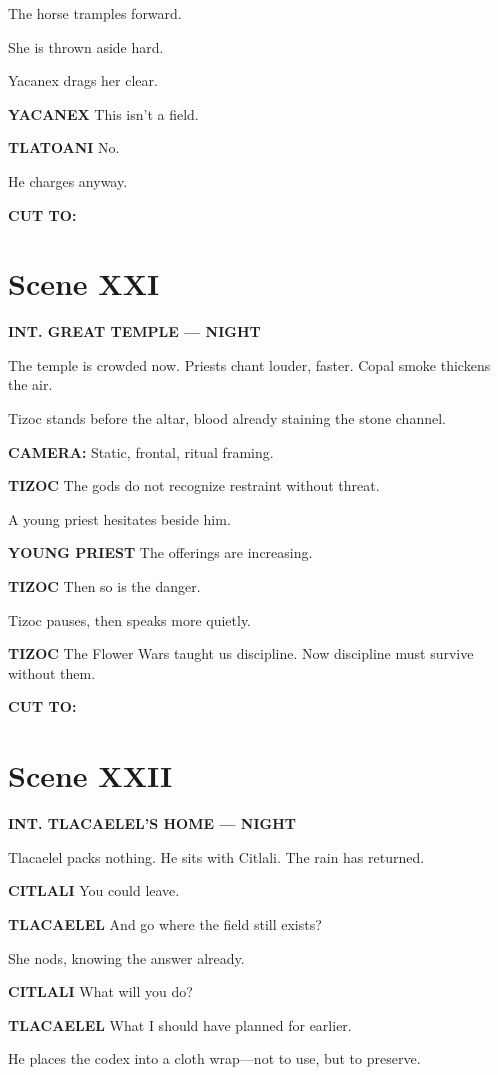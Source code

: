 \documentclass[12pt]{article}
\begin{document}
The horse tramples forward.

She is thrown aside hard.

Yacanex drags her clear.

\textbf{YACANEX}  
This isn’t a field.

\textbf{TLATOANI}  
No.

He charges anyway.

\textbf{CUT TO:}

\section*{Scene XXI}

\textbf{INT. GREAT TEMPLE — NIGHT}

The temple is crowded now. Priests chant louder, faster. Copal smoke thickens the air.

Tizoc stands before the altar, blood already staining the stone channel.

\textbf{CAMERA:} Static, frontal, ritual framing.

\textbf{TIZOC}  
The gods do not recognize restraint  
without threat.

A young priest hesitates beside him.

\textbf{YOUNG PRIEST}  
The offerings are increasing.

\textbf{TIZOC}  
Then so is the danger.

Tizoc pauses, then speaks more quietly.

\textbf{TIZOC}  
The Flower Wars taught us discipline.  
Now discipline must survive without them.

\textbf{CUT TO:}

\section*{Scene XXII}

\textbf{INT. TLACAELEL’S HOME — NIGHT}

Tlacaelel packs nothing. He sits with Citlali. The rain has returned.

\textbf{CITLALI}  
You could leave.

\textbf{TLACAELEL}  
And go where the field still exists?

She nods, knowing the answer already.

\textbf{CITLALI}  
What will you do?

\textbf{TLACAELEL}  
What I should have planned for earlier.

He places the codex into a cloth wrap—not to use, but to preserve.
\end{document}
